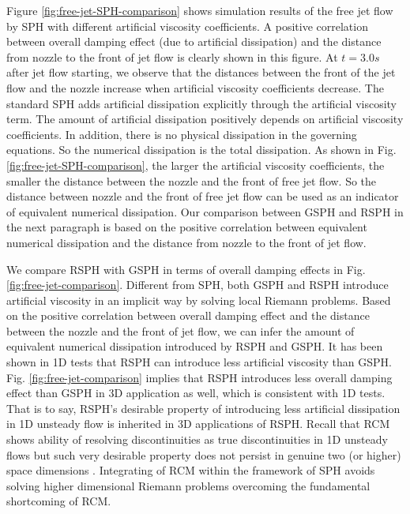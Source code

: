 \documentclass[preprint,12pt,authoryear]{elsarticle}
\begin{document}
Figure \ref{fig:free-jet-SPH-comparison} shows simulation results of the free jet flow by SPH with different artificial viscosity coefficients. A positive correlation between overall damping effect (due to artificial dissipation) and the distance from nozzle to the front of jet flow is clearly shown in this figure. At $t=3.0 s$ after jet flow starting, we observe that the distances between the front of the jet flow and the nozzle increase when artificial viscosity coefficients decrease. The standard SPH adds artificial dissipation explicitly through the artificial viscosity term. The amount of artificial dissipation positively depends on artificial viscosity coefficients. In addition, there is no physical dissipation in the governing equations. So the numerical dissipation is the total dissipation. As shown in Fig. \ref{fig:free-jet-SPH-comparison}, the larger the artificial viscosity coefficients, the smaller the distance between the nozzle and the front of free jet flow. So the distance between nozzle and the front of free jet flow can be used as an indicator of equivalent numerical dissipation.
Our comparison between GSPH and RSPH in the next paragraph is based on the positive correlation between equivalent numerical dissipation and the distance from nozzle to the front of jet flow.

We compare RSPH with GSPH in terms of overall damping effects in Fig. \ref{fig:free-jet-comparison}. Different from SPH, both GSPH and RSPH introduce artificial viscosity in an implicit way by solving local Riemann problems. Based on the positive correlation between overall damping effect and the distance between the nozzle and the front of jet flow, we can infer the amount of equivalent numerical dissipation introduced by RSPH and GSPH. It has been shown in 1D tests that RSPH can introduce less artificial viscosity than GSPH. Fig. \ref{fig:free-jet-comparison} implies that RSPH introduces less overall damping effect than GSPH in 3D application as well, which is consistent with 1D tests. That is to say, RSPH's desirable property of introducing less artificial dissipation in 1D unsteady flow is inherited in 3D applications of RSPH. Recall that RCM shows ability of resolving discontinuities as true discontinuities in 1D unsteady flows but such very desirable property does not persist in genuine two (or higher) space dimensions \citep{colella1982glimm}. Integrating of RCM within the framework of SPH avoids solving higher dimensional Riemann problems overcoming the fundamental shortcoming of RCM.
\end{document}
